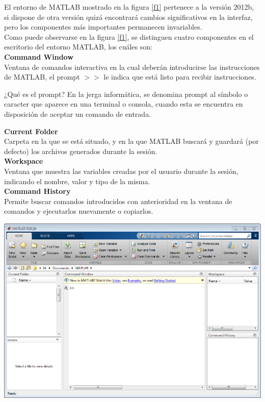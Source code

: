 El entorno de MATLAB mostrado en la figura \ref{f1} pertenece a la versión 2012b, si dispone de otra versión 
quizá encontrará cambios significativos en la interfaz, pero los componentes más importantes permanecen invariables.\\

Como puede observarse en la figura \ref{f1}, se distinguen cuatro componentes en el escritorio del entorno MATLAB, 
los cuáles son:\\

\textbf{Command Window}\\

Ventana de comandos interactiva en la cual deberán introducirse las instrucciones de MATLAB, el prompt \texttt{$>>$} 
le indica que está listo para recibir instrucciones.\\

\begin{informacion}{¿Qué es el prompt?}
En la jerga informática, se denomina prompt al símbolo o caracter que aparece 
en una terminal o consola, cuando esta se encuentra en disposición de aceptar un comando de entrada.
\end{informacion}

\textbf{Current Folder}\\

Carpeta en la que se está situado, y en la que MATLAB buscará y guardará (por defecto) los archivos 
generados durante la sesión.\\

\textbf{Workspace}\\

Ventana que muestra las variables creadas por el usuario durante la sesión, indicando el nombre, valor 
y tipo de la misma.\\

\textbf{Command History}\\

Permite buscar comandos introducidos con anterioridad en la ventana de comandos y ejecutarlos nuevamente 
o copiarlos.\\

\begin{center}
\includegraphics[scale=0.8]{src/ch1/img_1_1.png}
\label{f1}
\end{center}


